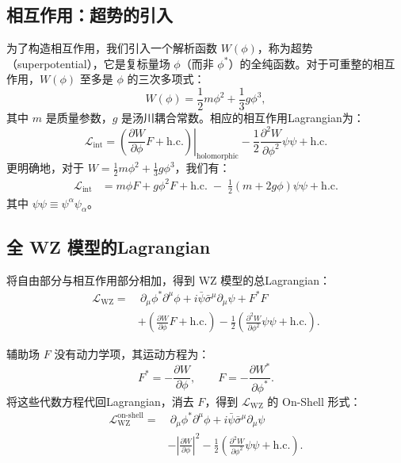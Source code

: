 \subsection*{相互作用：超势的引入}

为了构造相互作用，我们引入一个解析函数 $W(\phi)$，称为超势（superpotential），它是复标量场 $\phi$（而非 $\phi^\ast$）的全纯函数。对于可重整的相互作用，$W(\phi)$ 至多是 $\phi$ 的三次多项式：
\begin{equation}
W(\phi) = \frac12 m \phi^2 + \frac13 g \phi^3,
\end{equation}
其中 $m$ 是质量参数，$g$ 是汤川耦合常数。相应的相互作用Lagrangian为：
\begin{equation}
\mathcal{L}_{\text{int}} = \left. \left( \frac{\partial W}{\partial \phi} F + \text{h.c.} \right) \right|_{\text{holomorphic}} - \frac12 \left. \frac{\partial^2 W}{\partial \phi^2} \psi\psi + \text{h.c.} \right.
\end{equation}
更明确地，对于 $W = \frac12 m \phi^2 + \frac13 g \phi^3$，我们有：
\begin{align}
\mathcal{L}_{\text{int}} &= m \phi F + g \phi^2 F + \text{h.c.} \;-\; \frac12 (m + 2g\phi) \psi\psi + \text{h.c.}
\end{align}
其中 $\psi\psi \equiv \psi^\alpha \psi_\alpha$。

\subsection*{全 WZ 模型的Lagrangian}

将自由部分与相互作用部分相加，得到 WZ 模型的总Lagrangian：
\begin{align}
\mathcal{L}_{\text{WZ}} =& \ \partial_\mu \phi^\ast \partial^\mu \phi + i\bar\psi\bar\sigma^\mu\partial_\mu\psi + F^\ast F \nonumber\\
&+ \left( \frac{\partial W}{\partial\phi} F + \text{h.c.} \right) - \frac12 \left( \frac{\partial^2 W}{\partial\phi^2} \psi\psi + \text{h.c.} \right). \label{eq:wz_full}
\end{align}

辅助场 $F$ 没有动力学项，其运动方程为：
\begin{equation}
F^\ast = - \frac{\partial W}{\partial\phi}, \qquad F = - \frac{\partial W^\ast}{\partial\phi^\ast}.
\end{equation}
将这些代数方程代回Lagrangian，消去 $F$，得到 $\mathcal{L}_{\text{WZ}}$ 的 On-Shell 形式：
\begin{align}
\mathcal{L}_{\text{WZ}}^{\text{on-shell}} =& \ \partial_\mu \phi^\ast \partial^\mu \phi + i\bar\psi\bar\sigma^\mu\partial_\mu\psi \nonumber\\
&- \left| \frac{\partial W}{\partial\phi} \right|^2 - \frac12 \left( \frac{\partial^2 W}{\partial\phi^2} \psi\psi + \text{h.c.} \right). \label{eq:wz_onshell}
\end{align}

